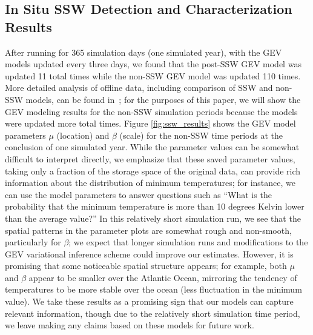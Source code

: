 \documentclass{juliacon}
\begin{document}
\subsection{In Situ SSW Detection and Characterization Results}
After running for 365 simulation days (one simulated year), with the GEV models updated every three days, we found that the post-SSW GEV model was updated 11 total times while the non-SSW GEV model was updated 110 times.
More detailed analysis of offline data, including comparison of SSW and non-SSW models, can be found in~\cite{ssw_isav}; for the purposes of this paper, we will show the GEV modeling results for the non-SSW simulation periods because the models were updated more total times.
Figure \ref{fig:ssw_results} shows the GEV model parameters $\mu$ (location) and $\beta$ (scale) for the non-SSW time periods at the conclusion of one simulated year. 
While the parameter values can be somewhat difficult to interpret directly, we emphasize that these saved parameter values, taking only a fraction of the storage space of the original data, can provide rich information about the distribution of minimum temperatures; for instance, we can use the model parameters to answer questions such as ``What is the probability that the minimum temperature is more than 10 degrees Kelvin lower than the average value?''
In this relatively short simulation run, we see that the spatial patterns in the parameter plots are somewhat rough and non-smooth, particularly for $\beta$; we expect that longer simulation runs and modifications to the GEV variational inference scheme could improve our estimates. 
However, it is promising that some noticeable spatial structure appears; for example, both $\mu$ and $\beta$ appear to be smaller over the Atlantic Ocean, mirroring the tendency of temperatures to be more stable over the ocean (less fluctuation in the minimum value). 
We take these results as a promising sign that our models can capture relevant information, though due to the relatively short simulation time period, we leave making any claims based on these models for future work.
\end{document}
